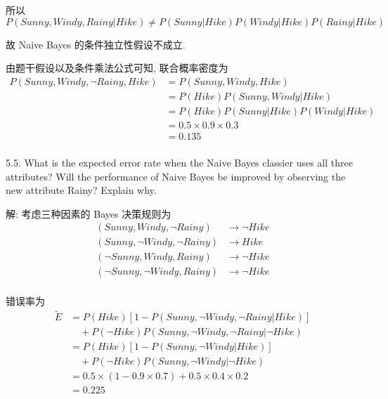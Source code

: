 \documentclass[openany]{ctexbook}
\theoremstyle{kaiti}
\theoremstyle{normal}
\begin{document}
所以
\begin{equation}
  P(Sunny,Windy,Rainy|Hike)\neq P(Sunny|Hike)P(Windy|Hike)P(Rainy|Hike)
\end{equation}

故 Naive Bayes 的条件独立性假设不成立.

由题干假设以及条件乘法公式可知, 联合概率密度为
\begin{equation}
  \begin{aligned}
    P(Sunny,Windy,\neg Rainy,Hike)
    &=P(Sunny,Windy,Hike)\\
    &=P(Hike)P(Sunny,Windy|Hike)\\
    &=P(Hike)P(Sunny|Hike)P(Windy|Hike)\\
    &=0.5 \times 0.9 \times 0.3\\
    &=0.135\\
  \end{aligned}
\end{equation}


5.5. What is the expected error rate when the Naive Bayes classier uses all three attributes? Will the performance of Naive Bayes be improved by observing the new attribute Rainy? Explain why. 

解: 考虑三种因素的 Bayes 决策规则为
\begin{equation}
  \begin{aligned}
    (Sunny,Windy,\neg Rainy)&\to\neg Hike\\
    (Sunny,\neg Windy,\neg Rainy)&\to Hike\\
    (\neg Sunny,Windy,Rainy)&\to\neg Hike\\
    (\neg Sunny,\neg Windy,Rainy)&\to\neg Hike\\
  \end{aligned}
\end{equation}

错误率为
\begin{equation}
  \begin{aligned}
    \tilde{E}
    &=P(Hike)[1-P(Sunny,\neg Windy,\neg Rainy|Hike)]\\
    &\quad+P(\neg Hike)P(Sunny,\neg Windy,\neg Rainy|\neg Hike)\\
    &=P(Hike)[1-P(Sunny,\neg Windy|Hike)]\\
    &\quad+P(\neg Hike)P(Sunny,\neg Windy|\neg Hike)\\
    &=0.5\times(1-0.9\times0.7)+0.5\times0.4\times0.2\\
    &=0.225\\
  \end{aligned}
\end{equation}
\end{document}
